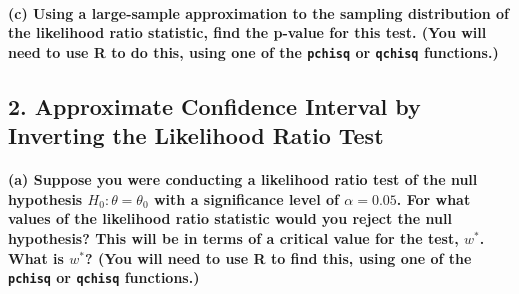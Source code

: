 \documentclass[]{article}
\let\oldparagraph\paragraph
\renewcommand{\paragraph}[1]{\oldparagraph{#1}\mbox{}}
\begin{document}
\vspace{3cm}

\paragraph{\texorpdfstring{(c) Using a large-sample approximation to the
sampling distribution of the likelihood ratio statistic, find the
p-value for this test. (You will need to use R to do this, using one of
the \texttt{pchisq} or \texttt{qchisq}
functions.)}{(c) Using a large-sample approximation to the sampling distribution of the likelihood ratio statistic, find the p-value for this test. (You will need to use R to do this, using one of the pchisq or qchisq functions.)}}\label{c-using-a-large-sample-approximation-to-the-sampling-distribution-of-the-likelihood-ratio-statistic-find-the-p-value-for-this-test.-you-will-need-to-use-r-to-do-this-using-one-of-the-pchisq-or-qchisq-functions.}

\newpage

\subsection{2. Approximate Confidence Interval by Inverting the
Likelihood Ratio
Test}\label{approximate-confidence-interval-by-inverting-the-likelihood-ratio-test}

\paragraph{\texorpdfstring{(a) Suppose you were conducting a likelihood
ratio test of the null hypothesis \(H_0: \theta = \theta_0\) with a
significance level of \(\alpha = 0.05\). For what values of the
likelihood ratio statistic would you reject the null hypothesis? This
will be in terms of a critical value for the test, \(w^*\). What is
\(w^*\)? (You will need to use R to find this, using one of the
\texttt{pchisq} or \texttt{qchisq}
functions.)}{(a) Suppose you were conducting a likelihood ratio test of the null hypothesis H\_0: \textbackslash{}theta = \textbackslash{}theta\_0 with a significance level of \textbackslash{}alpha = 0.05. For what values of the likelihood ratio statistic would you reject the null hypothesis? This will be in terms of a critical value for the test, w\^{}*. What is w\^{}*? (You will need to use R to find this, using one of the pchisq or qchisq functions.)}}\label{a-suppose-you-were-conducting-a-likelihood-ratio-test-of-the-null-hypothesis-h_0-theta-theta_0-with-a-significance-level-of-alpha-0.05.-for-what-values-of-the-likelihood-ratio-statistic-would-you-reject-the-null-hypothesis-this-will-be-in-terms-of-a-critical-value-for-the-test-w.-what-is-w-you-will-need-to-use-r-to-find-this-using-one-of-the-pchisq-or-qchisq-functions.}
\end{document}
